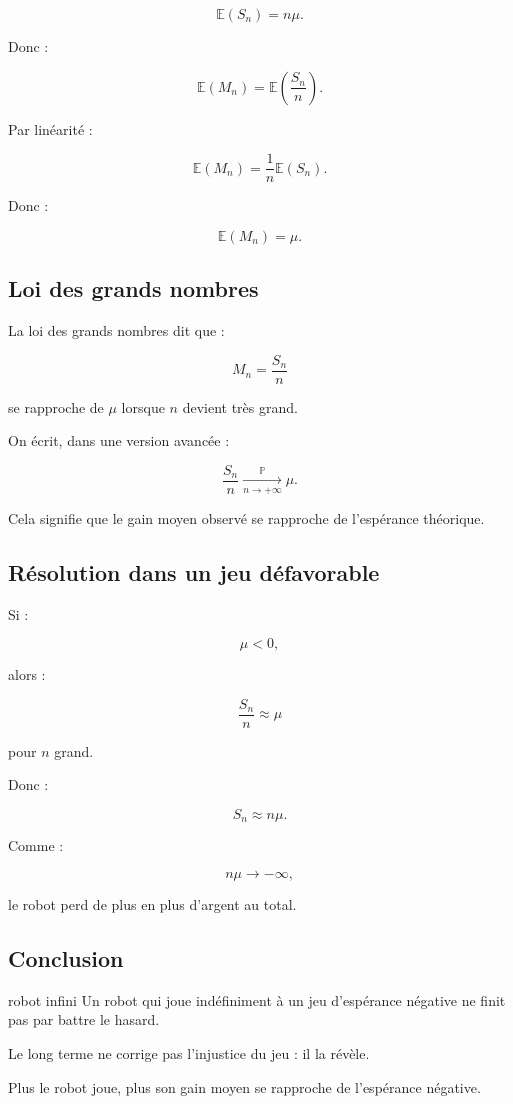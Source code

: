 \documentclass[11pt,a4paper]{article}
\newcommand{\E}{\mathbb{E}}
\newcommand{\Prob}{\mathbb{P}}
\begin{document}
\[
\E(S_n)=n\mu.
\]

Donc :

\[
\E(M_n)=\E\left(\frac{S_n}{n}\right).
\]

Par linéarité :

\[
\E(M_n)=\frac{1}{n}\E(S_n).
\]

Donc :

\[
\E(M_n)=\mu.
\]

\subsection{Loi des grands nombres}

La loi des grands nombres dit que :

\[
M_n=\frac{S_n}{n}
\]

se rapproche de $\mu$ lorsque $n$ devient très grand.

On écrit, dans une version avancée :

\[
\frac{S_n}{n}\xrightarrow[n\to+\infty]{\Prob}\mu.
\]

Cela signifie que le gain moyen observé se rapproche de l'espérance théorique.

\subsection{Résolution dans un jeu défavorable}

Si :

\[
\mu<0,
\]

alors :

\[
\frac{S_n}{n}\approx \mu
\]

pour $n$ grand.

Donc :

\[
S_n\approx n\mu.
\]

Comme :

\[
n\mu\to -\infty,
\]

le robot perd de plus en plus d'argent au total.

\subsection{Conclusion}

\begin{conclusionbox}{robot infini}
Un robot qui joue indéfiniment à un jeu d'espérance négative ne finit pas par battre le hasard.

Le long terme ne corrige pas l'injustice du jeu : il la révèle.

Plus le robot joue, plus son gain moyen se rapproche de l'espérance négative.
\end{conclusionbox}
\end{document}
